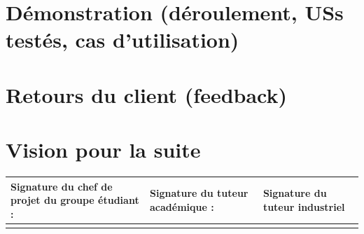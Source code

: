 \documentclass[12pt,titlepage,french]{article}
\begin{document}
\section{Démonstration (déroulement, USs testés, cas d'utilisation)}

\section{Retours du client (feedback)}

\section{Vision pour la suite}


\noindent\begin{tabularx}{\textwidth}{|X|X|X|}
    \hline
    \textbf{Signature du chef de projet du groupe étudiant :} & \textbf{Signature du tuteur académique :} & \textbf{Signature du tuteur industriel}\\
    \hline
   \rule{0pt}{3cm} &
    &\\
    \hline
\end{tabularx}
\end{document}
